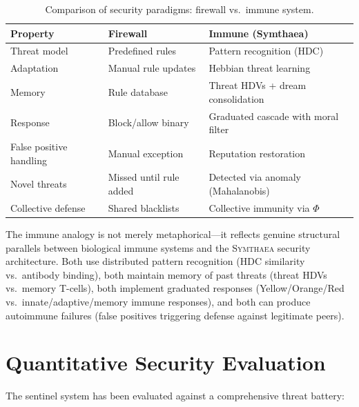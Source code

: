 \documentclass[12pt]{book}
\newcommand{\symthaea}{\textsc{Symthaea}}
\begin{document}
\begin{table}[H]
\centering
\caption{Comparison of security paradigms: firewall vs.\ immune system.}
\label{tab:security-paradigm}
\begin{tabular}{lll}
\toprule
\textbf{Property} & \textbf{Firewall} & \textbf{Immune (Symthaea)} \\
\midrule
Threat model & Predefined rules & Pattern recognition (HDC) \\
Adaptation & Manual rule updates & Hebbian threat learning \\
Memory & Rule database & Threat HDVs + dream consolidation \\
Response & Block/allow binary & Graduated cascade with moral filter \\
False positive handling & Manual exception & Reputation restoration \\
Novel threats & Missed until rule added & Detected via anomaly (Mahalanobis) \\
Collective defense & Shared blacklists & Collective immunity via $\Phi$ \\
\bottomrule
\end{tabular}
\end{table}

The immune analogy is not merely metaphorical---it reflects genuine structural parallels between biological immune systems and the \symthaea{} security architecture. Both use distributed pattern recognition (HDC similarity vs.\ antibody binding), both maintain memory of past threats (threat HDVs vs.\ memory T-cells), both implement graduated responses (Yellow/Orange/Red vs.\ innate/adaptive/memory immune responses), and both can produce autoimmune failures (false positives triggering defense against legitimate peers).

\section{Quantitative Security Evaluation}

The sentinel system has been evaluated against a comprehensive threat battery:
\end{document}
